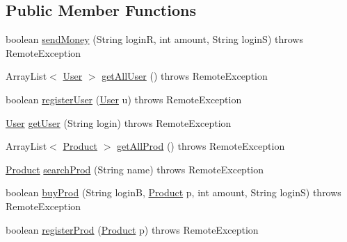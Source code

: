 \subsection*{Public Member Functions}
\begin{DoxyCompactItemize}
\item 
boolean \hyperlink{interfacees_1_1deusto_1_1server_1_1remote_1_1_i_transferer_ab43399cfce0d84f6e27032a7c14865f6}{send\+Money} (String loginR, int amount, String loginS)  throws Remote\+Exception
\item 
Array\+List$<$ \hyperlink{classes_1_1deusto_1_1server_1_1db_1_1data_1_1_user}{User} $>$ \hyperlink{interfacees_1_1deusto_1_1server_1_1remote_1_1_i_transferer_aec6609427d773f075a78295a97888103}{get\+All\+User} ()  throws Remote\+Exception
\item 
boolean \hyperlink{interfacees_1_1deusto_1_1server_1_1remote_1_1_i_transferer_ab805207e578865de5bf2e69ca8942344}{register\+User} (\hyperlink{classes_1_1deusto_1_1server_1_1db_1_1data_1_1_user}{User} u)  throws Remote\+Exception
\item 
\hyperlink{classes_1_1deusto_1_1server_1_1db_1_1data_1_1_user}{User} \hyperlink{interfacees_1_1deusto_1_1server_1_1remote_1_1_i_transferer_ab767521556fc61bc5a39306080f00cae}{get\+User} (String login)  throws Remote\+Exception
\item 
Array\+List$<$ \hyperlink{classes_1_1deusto_1_1server_1_1db_1_1data_1_1_product}{Product} $>$ \hyperlink{interfacees_1_1deusto_1_1server_1_1remote_1_1_i_transferer_a71afa6799122b3f09805f86d2e58fc23}{get\+All\+Prod} ()  throws Remote\+Exception
\item 
\hyperlink{classes_1_1deusto_1_1server_1_1db_1_1data_1_1_product}{Product} \hyperlink{interfacees_1_1deusto_1_1server_1_1remote_1_1_i_transferer_a1fb33a5447e1647ffde8a01d180b8d99}{search\+Prod} (String name)  throws Remote\+Exception
\item 
boolean \hyperlink{interfacees_1_1deusto_1_1server_1_1remote_1_1_i_transferer_a86d92e8a78257551122807ae02259950}{buy\+Prod} (String loginB, \hyperlink{classes_1_1deusto_1_1server_1_1db_1_1data_1_1_product}{Product} p, int amount, String loginS)  throws Remote\+Exception
\item 
boolean \hyperlink{interfacees_1_1deusto_1_1server_1_1remote_1_1_i_transferer_a06629c7021aae4d2ce1a449726102ded}{register\+Prod} (\hyperlink{classes_1_1deusto_1_1server_1_1db_1_1data_1_1_product}{Product} p)  throws Remote\+Exception
\end{DoxyCompactItemize}


